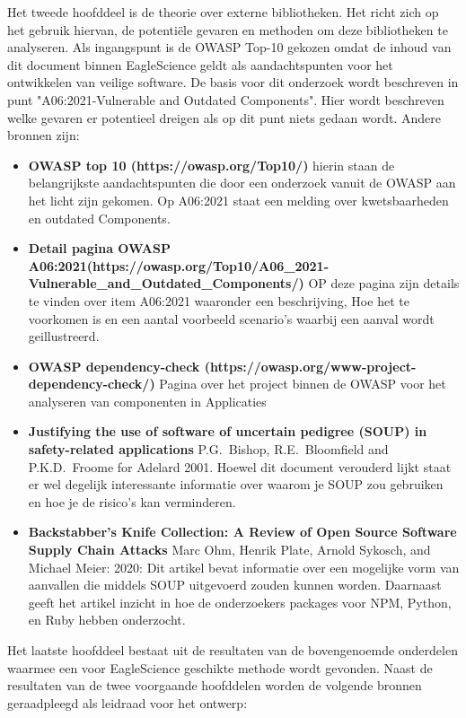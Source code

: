 Het tweede hoofddeel is de theorie over externe bibliotheken. Het richt zich op het gebruik hiervan, de potentiële gevaren en methoden om deze bibliotheken te analyseren. Als ingangspunt is de OWASP Top-10 gekozen omdat de inhoud van dit document binnen EagleScience geldt als aandachtspunten voor het ontwikkelen van veilige software. De basis voor dit onderzoek wordt beschreven in punt "A06:2021-Vulnerable and Outdated Components". Hier wordt beschreven welke gevaren er potentieel dreigen als op dit punt niets gedaan wordt. Andere bronnen zijn:
\begin{itemize}
    \item \textbf{OWASP top 10 (https://owasp.org/Top10/)} hierin staan de belangrijkste aandachtspunten die door een onderzoek vanuit de OWASP aan het licht zijn gekomen. Op A06:2021 staat een melding over kwetsbaarheden en outdated Components.
    \item \textbf{Detail pagina OWASP A06:2021(https://owasp.org/Top10/A06_2021-Vulnerable_and_Outdated_Components/)} OP deze pagina zijn details te vinden over item A06:2021 waaronder een beschrijving, Hoe het te voorkomen is en een aantal voorbeeld scenario's waarbij een aanval wordt geillustreerd.
    \item \textbf{OWASP dependency-check (https://owasp.org/www-project-dependency-check/)} Pagina over het project binnen de OWASP voor het analyseren van componenten in Applicaties
    \item \textbf{Justifying the use of software of uncertain pedigree (SOUP) in safety-related applications} P.G.\ Bishop, R.E.\ Bloomfield and P.K.D.\  Froome for Adelard 2001. Hoewel dit document verouderd lijkt staat er wel degelijk interessante informatie over waarom je SOUP zou gebruiken en hoe je de risico's kan verminderen.
    \item \textbf{Backstabber’s Knife Collection: A Review of Open Source Software Supply Chain Attacks} Marc Ohm, Henrik Plate, Arnold Sykosch, and Michael Meier: 2020: Dit artikel bevat informatie over een mogelijke vorm van aanvallen die middels SOUP uitgevoerd zouden kunnen worden. Daarnaast geeft het artikel inzicht in hoe de onderzoekers packages voor NPM, Python, en Ruby hebben onderzocht.
\end{itemize}
Het laatste hoofddeel bestaat uit de resultaten van de bovengenoemde onderdelen waarmee een voor EagleScience geschikte methode wordt gevonden. Naast de resultaten van de twee voorgaande hoofddelen worden de volgende bronnen geraadpleegd als leidraad voor het ontwerp:

